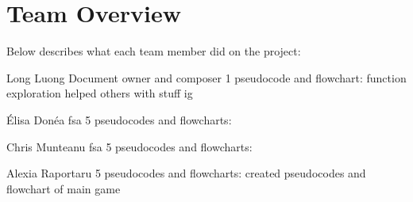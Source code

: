 \section{Team Overview} \label{section: overview}
Below describes what each team member did on the project:

Long Luong
Document owner and composer
1 pseudocode and flowchart:
function exploration
helped others with stuff ig


Élisa Donéa
fsa
5 pseudocodes and flowcharts:

Chris Munteanu
fsa
5 pseudocodes and flowcharts:

Alexia Raportaru
5 pseudocodes and flowcharts:
created pseudocodes and flowchart of main game

